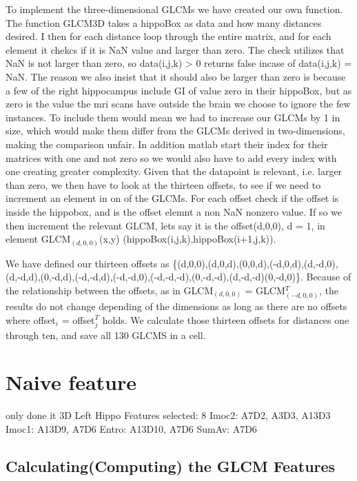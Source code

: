 To implement the three-dimensional GLCMs we have created our own function.
The function GLCM3D takes a hippoBox as data and how many distances desired. I then for each distance loop through the entire matrix, and for each element it chekcs if it is NaN value and larger than zero. The check utilizes that NaN is not larger than zero, so data(i,j,k) > 0 returns false incase of data(i,j,k) = NaN.
The reason we also insist that it should also be larger than zero is because a few of the right hippocampus include GI of value zero in their hippoBox, but as zero is the value the mri scans have outside the brain we choose to ignore the few instances. To include them would mean we had to increase our GLCMs by 1 in size, which would make them differ from the GLCMs derived in two-dimensions, making the comparison unfair. In addition matlab start their index for their matrices with one and not zero so we would also have to add every index with one creating greater complexity.
Given that the datapoint is relevant, i.e. larger than zero, we then have to look at the thirteen offsets, to see if we need to increment an element in on of the GLCMs. For each offset check if the offset is inside the hippobox, and is the offset elemnt a non NaN nonzero value. If so we then increment the relevant GLCM, lets say it is the offset(d,0,0), d = 1, in element GLCM$_(d,0,0)$(x,y) (hippoBox(i,j,k),hippoBox(i+1,j,k)).

We have defined our thirteen offsets as \{(d,0,0),(d,0,d),(0,0,d),(-d,0,d),(d,-d,0),(d,-d,d),(0,-d,d),(-d,-d,d),(-d,-d,0),(-d,-d,-d),(0,-d,-d),(d,-d,-d)(0,-d,0)\}.
Because of the relationship between the offsets, as in GLCM$_{(d,0,0)}$ = GLCM$_{(-d,0,0)}^T$, the results do not change depending of the dimensions as long as there are no offsets where offset$_i$ = offset$_j^T$ holds.
We calculate those thirteen offsets for distances one through ten, and save all 130 GLCMS in a cell.

\section{Naive feature}
only done it 3D
Left Hippo
Features selected: 8
Imoc2: A7D2, A3D3, A13D3
Imoc1: A13D9, A7D6
Entro: A13D10, A7D6
SumAv: A7D6

\subsection{Calculating(Computing) the GLCM Features}

